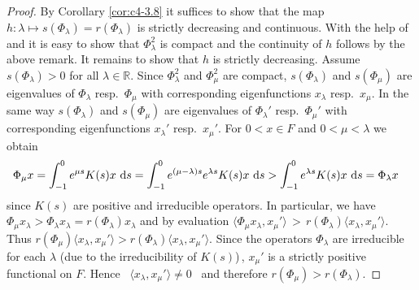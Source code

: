 \begin{proof}
By Corollary \ref{cor:c4-3.8} it suffices to show that the map $h \colon \lambda \mapsto s(\Phi_{\lambda}) = r(\Phi_{\lambda})$ is strictly decreasing and continuous.
With the help of \citet[Theorem III.11.4]{schaefer:1966} and \citet[Theorem II.9.9]{schaefer:1974} it is easy to show that $\Phi_{\lambda}^{2}$ is compact and the continuity of $h$ follows by the above remark.
It remains to show that $h$ is strictly decreasing.
Assume $s(\Phi_{\lambda}) > 0$ for all $\lambda \in \mathbb{R}$.
Since $\Phi_{\lambda}^{2}$ and $\Phi_{\mu}^{2}$ are compact, 
$s(\Phi_{\lambda})$ and $s(\Phi_{\mu})$ are eigenvalues of $\Phi_{\lambda}$ resp.\ $\Phi_{\mu}$ with corresponding eigenfunctions $x_{\lambda}$ resp.\ $x_{\mu}$.
In the same way $s(\Phi_{\lambda})$ and $s(\Phi_{\mu})$ are eigenvalues of $\Phi_{\lambda}'$ resp.\ $\Phi_{\mu}'$ with corresponding eigenfunctions $x_{\lambda}'$ resp.\ $x_{\mu}'$.
For $0 < x \in F$ and $0 < \mu < \lambda$ we obtain
\begin{align*}
\Phi_{\mu}x &= \int_{-1}^{0} e^{\mu s}K(s)x \, \mathop{}\!\mathrm{d}{s} = \int_{-1}^{0} e^{(\mu-\lambda) s}e^{\lambda s}K(s)x \, \mathop{}\!\mathrm{d}{s} > \int_{-1}^{0} e^{\lambda s}K(s)x \, \mathop{}\!\mathrm{d}{s} = \Phi_{\lambda}x
\end{align*}
since $K(s)$ are positive and irreducible operators.
In particular, we have 
\linebreak[4] 
$\Phi_{\mu}x_{\lambda} > \Phi_{\lambda}x_{\lambda} = r(\Phi_{\lambda})x_{\lambda}$ and by evaluation $\langle\Phi_{\mu}x_{\lambda},x_{\mu}'\rangle \,>\, r(\Phi_{\lambda})\langle x_{\lambda},x_{\mu}'\rangle$.
Thus $r(\Phi_{\mu})\langle x_{\lambda},x_{\mu}'\rangle > r(\Phi_{\lambda})\langle x_{\lambda},x_{\mu}'\rangle$.
Since the operators $\Phi_{\lambda}$ are irreducible for each $\lambda$ (due to the irreducibility of $K(s)$)\,, $x_{\mu}'$ is a strictly positive functional on $F$.
Hence \ $\langle x_{\lambda},x_{\mu}'\rangle \neq 0$ \ and therefore
\linebreak[3]
$r(\Phi_{\mu}) > r(\Phi_{\lambda})$.
\end{proof}
